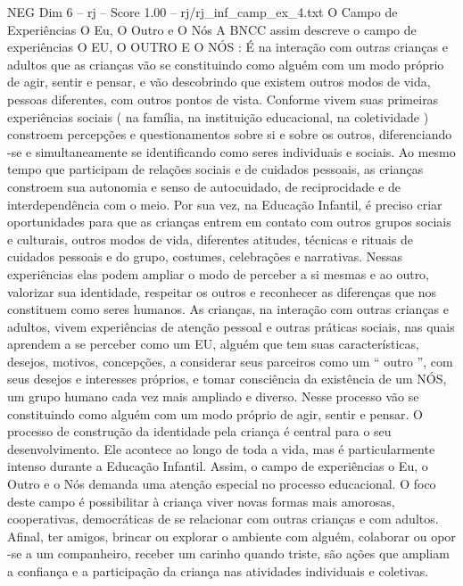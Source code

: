 \begin{textsample}{NEG Dim 6 – rj – Score 1.00 – rj/rj\_inf\_camp\_ex\_4.txt}  \label{ex:f6_neg_009}
O Campo de Experiências O Eu, O Outro e O Nós A BNCC assim descreve o campo de experiências O EU, O OUTRO E O NÓS : É na interação com outras crianças e adultos que as crianças vão se constituindo como alguém com um modo próprio de agir, sentir e pensar, e vão descobrindo que existem outros modos de vida, pessoas diferentes, com outros pontos de vista.
Conforme vivem suas primeiras experiências sociais ( na família, na instituição educacional, na coletividade ) constroem percepções e questionamentos sobre si e sobre os outros, diferenciando -se e simultaneamente se identificando como seres individuais e sociais.
Ao mesmo tempo que participam de relações sociais e de cuidados pessoais, as crianças constroem sua autonomia e senso de autocuidado, de reciprocidade e de interdependência com o meio.
Por sua vez, na Educação Infantil, é preciso criar oportunidades para que as crianças entrem em contato com outros grupos sociais e culturais, outros modos de vida, diferentes atitudes, técnicas e rituais de cuidados pessoais e do grupo, costumes, celebrações e narrativas.
Nessas experiências elas podem ampliar o modo de perceber a si mesmas e ao outro, valorizar sua identidade, respeitar os outros e reconhecer as diferenças que nos constituem como seres humanos.
As crianças, na interação com outras crianças e adultos, vivem experiências de atenção pessoal e outras práticas sociais, nas quais aprendem a se perceber como um EU, alguém que tem suas características, desejos, motivos, concepções, a considerar seus parceiros como um “ outro ”, com seus desejos e interesses próprios, e tomar consciência da existência de um NÓS, um grupo humano cada vez mais ampliado e diverso.
Nesse processo vão se constituindo como alguém com um modo próprio de agir, sentir e pensar.
O processo de construção da identidade pela criança é central para o seu desenvolvimento.
Ele acontece ao longo de toda a vida, mas é particularmente intenso durante a Educação Infantil.
Assim, o campo de experiências o Eu, o Outro e o Nós demanda uma atenção especial no processo educacional.
O foco deste campo é possibilitar à criança viver novas formas mais amorosas, cooperativas, democráticas de se relacionar com outras crianças e com adultos.
Afinal, ter amigos, brincar ou explorar o ambiente com alguém, colaborar ou opor -se a um companheiro, receber um carinho quando triste, são ações que ampliam a confiança e a participação da criança nas atividades individuais e coletivas.

\end{textsample}

